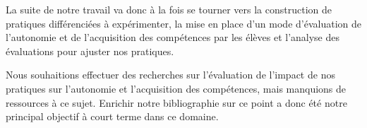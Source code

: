 La suite de notre travail va donc à la fois se tourner vers la construction de pratiques différenciées à expérimenter, la mise en place d’un mode d’évaluation de l’autonomie et de l’acquisition des compétences par les élèves et l’analyse des évaluations pour ajuster nos pratiques.

Nous souhaitions effectuer des recherches sur l’évaluation de l’impact de nos pratiques sur l’autonomie et l’acquisition des compétences, mais manquions de ressources à ce sujet. Enrichir notre bibliographie sur ce point a donc été notre principal objectif à court terme dans ce domaine.
